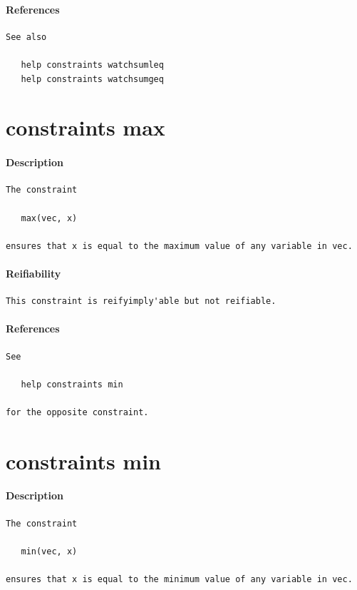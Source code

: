 \documentclass[oneside]{book}
\begin{document}
\paragraph{References}
{\footnotesize
\begin{verbatim}
See also

   help constraints watchsumleq
   help constraints watchsumgeq
\end{verbatim}
}
\section{constraints max}
\paragraph{Description}
{\footnotesize
\begin{verbatim}
The constraint

   max(vec, x)

ensures that x is equal to the maximum value of any variable in vec.
\end{verbatim}
}
\paragraph{Reifiability}
{\footnotesize
\begin{verbatim}
This constraint is reifyimply'able but not reifiable.
\end{verbatim}
}
\paragraph{References}
{\footnotesize
\begin{verbatim}
See

   help constraints min

for the opposite constraint.
\end{verbatim}
}
\section{constraints min}
\paragraph{Description}
{\footnotesize
\begin{verbatim}
The constraint

   min(vec, x)

ensures that x is equal to the minimum value of any variable in vec.
\end{verbatim}
}
\end{document}
